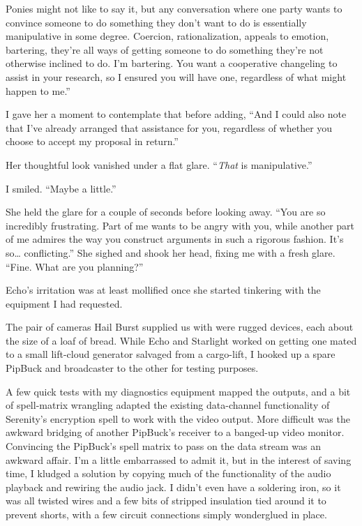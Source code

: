 \leavevmode{}Ponies might not like to say it, but any conversation where one party wants to convince someone to do something they don’t want to do is essentially manipulative in some degree. Coercion, rationalization, appeals to emotion, bartering, they’re all ways of getting someone to do something they’re not otherwise inclined to do. I’m bartering. You want a cooperative changeling to assist in your research, so I ensured you will have one, regardless of what might happen to me.”

I gave her a moment to contemplate that before adding, “And I could also note that I’ve already arranged that assistance for you, regardless of whether you choose to accept my proposal in return.”

Her thoughtful look vanished under a flat glare. “\textit{That} is manipulative.”

I smiled. “Maybe a little.”

She held the glare for a couple of seconds before looking away. “You are so incredibly frustrating. Part of me wants to be angry with you, while another part of me admires the way you construct arguments in such a rigorous fashion. It’s so… conflicting.” She sighed and shook her head, fixing me with a fresh glare. “Fine. What are you planning?”

{\br}%
Echo’s irritation was at least mollified once she started tinkering with the equipment I had requested.

The pair of cameras Hail Burst supplied us with were rugged devices, each about the size of a loaf of bread. While Echo and Starlight worked on getting one mated to a small lift-cloud generator salvaged from a cargo-lift, I hooked up a spare PipBuck and broadcaster to the other for testing purposes.

A few quick tests with my diagnostics equipment mapped the outputs, and a bit of spell-matrix wrangling adapted the existing data-channel functionality of Serenity’s encryption spell to work with the video output. More difficult was the awkward bridging of another PipBuck’s receiver to a banged-up video monitor. Convincing the PipBuck’s spell matrix to pass on the data stream was an awkward affair. I’m a little embarrassed to admit it, but in the interest of saving time, I kludged a solution by copying much of the functionality of the audio playback and rewiring the audio jack. I didn’t even have a soldering iron, so it was all twisted wires and a few bits of stripped insulation tied around it to prevent shorts, with a few circuit connections simply wonderglued in place.

